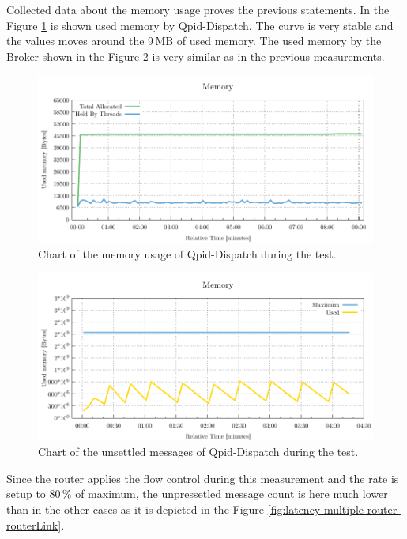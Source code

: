 Collected data about the memory usage proves the previous statements. In the Figure \ref{fig:latency-multiple-router-memory} is shown used memory by Qpid-Dispatch. The curve is very stable and the values moves around the 9\,MB of used memory. The used memory by the Broker shown in the Figure \ref{fig:latency-multiple-broker-memory} is very similar as in the previous measurements.

\begin{figure}[H]
	\centering
	\includegraphics[width=1\linewidth]{obrazky-figures/charts/multipoint-router-only-latency-memory.pdf}
	\caption{Chart of the memory usage of Qpid-Dispatch during the test.}
	\label{fig:latency-multiple-router-memory}
\end{figure}

\begin{figure}[H]
	\centering
	\includegraphics[width=1\linewidth]{obrazky-figures/charts/multipoint-router-broker-latency-memory.pdf}
	\caption{Chart of the unsettled messages of Qpid-Dispatch during the test.}
	\label{fig:latency-multiple-broker-memory}
\end{figure}

Since the router applies the flow control during this measurement and the rate is setup to 80\,\% of maximum, the unpressetled message count is here much lower than in the other cases as it is depicted in the Figure \ref{fig:latency-multiple-router-routerLink}.

